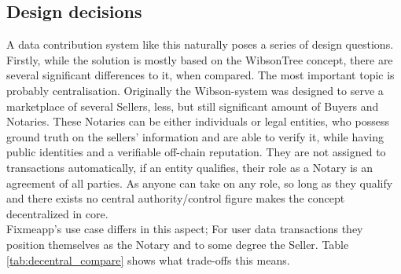 \documentclass[english, 12pt, a4paper, sci, utf8, a-2b, online]{aaltothesis}
\theoremstyle{change}
\theoremstyle{theoremstyle}
\begin{document}
\subsection{Design decisions}
A data contribution system like this naturally poses a series of design questions. Firstly, while the solution is mostly based on the WibsonTree concept, there are several significant differences to it, when compared. The most important topic is probably centralisation. Originally the Wibson-system was designed to serve a marketplace of several Sellers, less, but still significant amount of Buyers and Notaries. These Notaries can be either individuals or legal entities, who possess ground truth on the sellers' information and are able to verify it, while having public identities and a verifiable off-chain reputation. \cite{travizano2020wibson}
They are not assigned to transactions automatically, if an entity qualifies, their role as a Notary is an agreement of all parties.
As anyone can take on any role, so long as they qualify and there exists no central authority/control figure makes the concept decentralized in core.\\
Fixmeapp's use case differs in this aspect; For user data transactions they position themselves as the Notary and to some degree the Seller. Table \ref{tab:decentral_compare} shows what trade-offs this means.\\
\end{document}
